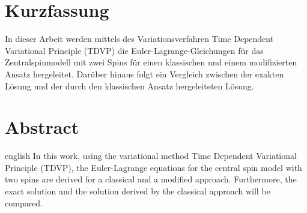 \thispagestyle{plain}

\section*{Kurzfassung}
In dieser Arbeit werden mittels des Variationsverfahren \glqq Time Dependent Variational Principle\grqq{} (TDVP) die Euler-Lagrange-Gleichungen für 
das Zentralspinmodell mit zwei Spins für einen klassischen und einem modifizierten Ansatz hergeleitet. Darüber hinaus folgt ein Vergleich zwischen der exakten Lösung
und der durch den klassischen Ansatz hergeleiteten Lösung.

\section*{Abstract}
\begin{foreignlanguage}{english}
In this work, using the variational method \glqq Time Dependent Variational Principle\grqq{} (TDVP), the Euler-Lagrange equations for the 
central spin model with two spins are derived for a classical and a modified approach. Furthermore, the exact solution
and the solution derived by the classical approach will be compared.
\end{foreignlanguage}
